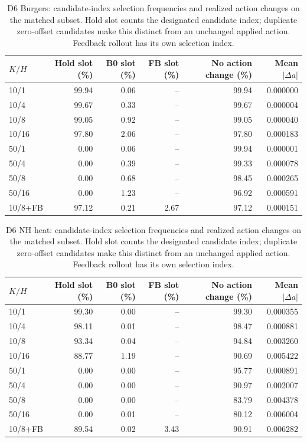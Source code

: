 \begin{table}[ht]
\centering\small
\caption{D6 Burgers: candidate-index selection frequencies and realized action changes on the matched subset. Hold slot counts the designated candidate index; duplicate zero-offset candidates make this distinct from an unchanged applied action. Feedback rollout has its own selection index.}
\begin{tabular}{@{}lrrrrr@{}}\toprule
$K/H$ & Hold slot (\%) & B0 slot (\%) & FB slot (\%) & No action change (\%) & Mean $|\Delta a|$\\\midrule
10/1 & 99.94 & 0.06 & -- & 99.94 & 0.000000\\
10/4 & 99.67 & 0.33 & -- & 99.67 & 0.000004\\
10/8 & 99.05 & 0.92 & -- & 99.05 & 0.000040\\
10/16 & 97.80 & 2.06 & -- & 97.80 & 0.000183\\
50/1 & 0.00 & 0.06 & -- & 99.94 & 0.000001\\
50/4 & 0.00 & 0.39 & -- & 99.33 & 0.000078\\
50/8 & 0.00 & 0.68 & -- & 98.45 & 0.000265\\
50/16 & 0.00 & 1.23 & -- & 96.92 & 0.000591\\
10/8+FB & 97.12 & 0.21 & 2.67 & 97.12 & 0.000151\\
\bottomrule\end{tabular}
\end{table}
\begin{table}[ht]
\centering\small
\caption{D6 NH heat: candidate-index selection frequencies and realized action changes on the matched subset. Hold slot counts the designated candidate index; duplicate zero-offset candidates make this distinct from an unchanged applied action. Feedback rollout has its own selection index.}
\begin{tabular}{@{}lrrrrr@{}}\toprule
$K/H$ & Hold slot (\%) & B0 slot (\%) & FB slot (\%) & No action change (\%) & Mean $|\Delta a|$\\\midrule
10/1 & 99.30 & 0.00 & -- & 99.30 & 0.000355\\
10/4 & 98.11 & 0.01 & -- & 98.47 & 0.000881\\
10/8 & 93.34 & 0.04 & -- & 94.84 & 0.003260\\
10/16 & 88.77 & 1.19 & -- & 90.69 & 0.005422\\
50/1 & 0.00 & 0.00 & -- & 95.77 & 0.000891\\
50/4 & 0.00 & 0.00 & -- & 90.97 & 0.002007\\
50/8 & 0.00 & 0.00 & -- & 83.79 & 0.004378\\
50/16 & 0.00 & 0.01 & -- & 80.12 & 0.006004\\
10/8+FB & 89.54 & 0.02 & 3.43 & 90.91 & 0.006282\\
\bottomrule\end{tabular}
\end{table}
